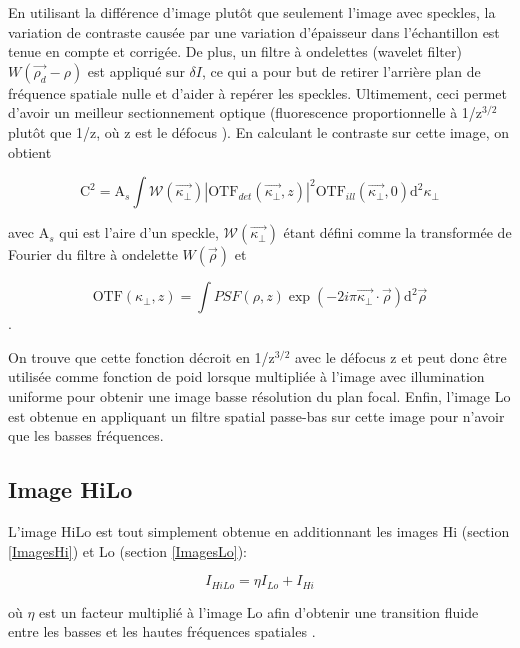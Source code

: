 \documentclass{article}       %
\begin{document}
En utilisant la différence d'image plutôt que seulement l'image avec speckles, la variation de contraste causée par une variation d'épaisseur dans l'échantillon est tenue en compte et corrigée. De plus, un filtre à ondelettes (wavelet filter) $W(\vec{\rho_{d}} - \rho)$ est appliqué sur $\delta I$, ce qui a pour but de retirer l'arrière plan de fréquence spatiale nulle et d'aider à repérer les speckles. Ultimement, ceci permet d'avoir un meilleur sectionnement optique (fluorescence proportionnelle à 1/z$^{3/2}$ plutôt que 1/z, où z est le défocus \cite{Mertz2011}). En calculant le contraste sur cette image, on obtient \cite{Mertz2011}

\begin{equation*}
    \text{C}^2 = \text{A}_{s}\int \mathcal{W}(\vec{\kappa_{\perp}}) |\text{OTF}_{det}(\vec{\kappa_{\perp}},z)|^{2}\text{OTF}_{ill}(\vec{\kappa_{\perp}},0)\text{d}^{2}\kappa_{\perp}
\end{equation*}

avec A$_{s}$ qui est l'aire d'un speckle, $\mathcal{W}(\vec{\kappa_{\perp}})$ étant défini comme la transformée de Fourier du filtre à ondelette $W(\vec{\rho})$ et 

\begin{equation*}
    \text{OTF}(\kappa_{\perp}, z) = \int PSF(\rho, z)\exp(-2i\pi\vec{\kappa_{\perp}}\cdot\vec{\rho})\text{d}^2\vec{\rho}
\end{equation*}.

On trouve que cette fonction décroit en 1/z$^{3/2}$ avec le défocus z et peut donc être utilisée comme fonction de poid lorsque multipliée à l'image avec illumination uniforme pour obtenir une image basse résolution du plan focal. Enfin, l'image Lo est obtenue en appliquant un filtre spatial passe-bas sur cette image pour n'avoir que les basses fréquences.

\newpage
\subsection{Image HiLo}

L'image HiLo est tout simplement obtenue en additionnant les images Hi (section \ref{ImagesHi}) et Lo (section \ref{ImagesLo}):

\begin{equation*}
    I_{HiLo} = \eta I_{Lo} + I_{Hi}
\end{equation*}

où $\eta$ est un facteur multiplié à l'image Lo afin d'obtenir une transition fluide entre les basses et les hautes fréquences spatiales \cite{Mertz2011}.
\end{document}
